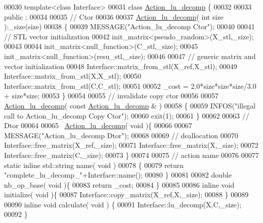 \begin{DoxyCode}
00030 \textcolor{keyword}{template}<\textcolor{keyword}{class} Interface>
00031 \textcolor{keyword}{class }\hyperlink{class_action__lu__decomp}{Action\_lu\_decomp} \{
00032 
00033 public :
00034 
00035   \textcolor{comment}{// Ctor}
00036 
00037   \hyperlink{class_action__lu__decomp}{Action\_lu\_decomp}( \textcolor{keywordtype}{int} size ):\_size(size)
00038   \{
00039     MESSAGE(\textcolor{stringliteral}{"Action\_lu\_decomp Ctor"});
00040 
00041     \textcolor{comment}{// STL vector initialization}
00042     init\_matrix<pseudo\_random>(X\_stl,\_size);
00043 
00044     init\_matrix<null\_function>(C\_stl,\_size);
00045     init\_matrix<null\_function>(resu\_stl,\_size);
00046 
00047     \textcolor{comment}{// generic matrix and vector initialization}
00048     Interface::matrix\_from\_stl(X\_ref,X\_stl);
00049     Interface::matrix\_from\_stl(X,X\_stl);
00050     Interface::matrix\_from\_stl(C,C\_stl);
00051 
00052     \_cost = 2.0*size*size*size/3.0 + size*size;
00053   \}
00054 
00055   \textcolor{comment}{// invalidate copy ctor}
00056 
00057   \hyperlink{class_action__lu__decomp}{Action\_lu\_decomp}( \textcolor{keyword}{const}  \hyperlink{class_action__lu__decomp}{Action\_lu\_decomp} & )
00058   \{
00059     INFOS(\textcolor{stringliteral}{"illegal call to Action\_lu\_decomp Copy Ctor"});
00060     exit(1);
00061   \}
00062 
00063   \textcolor{comment}{// Dtor}
00064 
00065   ~\hyperlink{class_action__lu__decomp}{Action\_lu\_decomp}( \textcolor{keywordtype}{void} )\{
00066 
00067     MESSAGE(\textcolor{stringliteral}{"Action\_lu\_decomp Dtor"});
00068 
00069     \textcolor{comment}{// deallocation}
00070     Interface::free\_matrix(X\_ref,\_size);
00071     Interface::free\_matrix(X,\_size);
00072     Interface::free\_matrix(C,\_size);
00073   \}
00074 
00075   \textcolor{comment}{// action name}
00076 
00077   \textcolor{keyword}{static} \textcolor{keyword}{inline} std::string name( \textcolor{keywordtype}{void} )
00078   \{
00079     \textcolor{keywordflow}{return} \textcolor{stringliteral}{"complete\_lu\_decomp\_"}+Interface::name();
00080   \}
00081 
00082   \textcolor{keywordtype}{double} nb\_op\_base( \textcolor{keywordtype}{void} )\{
00083     \textcolor{keywordflow}{return} \_cost;
00084   \}
00085 
00086   \textcolor{keyword}{inline} \textcolor{keywordtype}{void} initialize( \textcolor{keywordtype}{void} )\{
00087     Interface::copy\_matrix(X\_ref,X,\_size);
00088   \}
00089 
00090   \textcolor{keyword}{inline} \textcolor{keywordtype}{void} calculate( \textcolor{keywordtype}{void} ) \{
00091       Interface::lu\_decomp(X,C,\_size);
00092   \}

\end{DoxyCode}
